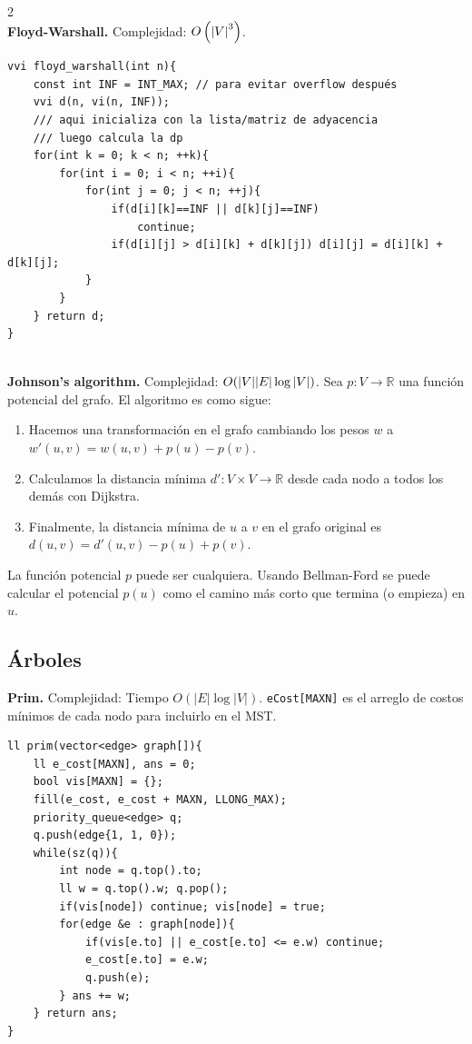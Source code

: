 \documentclass[10pt,spanish,mexico]{article}
\numberwithin{equation}{section}
\newcommand{\R}{\mathbb{R}}
\newcommand{\pa}[1]{\left( #1 \right)}
\begin{document}
\begin{multicols}{2}
\vspace{-1.2\baselineskip}
\hrulefill\\
\textbf{Floyd-Warshall.} Complejidad: $O\pa{\abs{V}^3}$.
\begin{verbatim}
vvi floyd_warshall(int n){
    const int INF = INT_MAX; // para evitar overflow después
    vvi d(n, vi(n, INF));
    /// aqui inicializa con la lista/matriz de adyacencia
    /// luego calcula la dp
    for(int k = 0; k < n; ++k){
        for(int i = 0; i < n; ++i){
            for(int j = 0; j < n; ++j){
                if(d[i][k]==INF || d[k][j]==INF)
                    continue;
                if(d[i][j] > d[i][k] + d[k][j]) d[i][j] = d[i][k] + d[k][j];
            }
        }
    } return d;
}
\end{verbatim}

\vspace{-1.2\baselineskip}
\hrulefill\\
\textbf{Johnson's algorithm.} Complejidad: $O(\abs{V}\abs{E}\log\abs{V})$. Sea $p: V \to \R$ una función potencial del grafo. El algoritmo es como sigue:
\begin{enumerate}[1.]
    \item Hacemos una transformación en el grafo cambiando los pesos $w$ a $w'(u, v) = w(u, v) + p(u) - p(v)$.
    \item Calculamos la distancia mínima $d': V \times V \to \R$ desde cada nodo a todos los demás con Dijkstra.
    \item Finalmente, la distancia mínima de $u$ a $v$ en el grafo original es $d(u, v) = d'(u, v) - p(u) + p(v)$.
\end{enumerate}
La función potencial $p$ puede ser cualquiera. Usando Bellman-Ford se puede calcular el potencial $p(u)$ como el camino más corto que termina (o empieza) en $u$.

\hrulefill
\subsection{Árboles}
\textbf{Prim.} Complejidad: Tiempo $O(|E| \log |V|)$. \texttt{eCost[MAXN]} es el arreglo de costos mínimos de cada nodo para incluirlo en el MST.
\begin{verbatim}
ll prim(vector<edge> graph[]){
    ll e_cost[MAXN], ans = 0;
    bool vis[MAXN] = {};
    fill(e_cost, e_cost + MAXN, LLONG_MAX);
    priority_queue<edge> q;
    q.push(edge{1, 1, 0});
    while(sz(q)){
        int node = q.top().to;
        ll w = q.top().w; q.pop();
        if(vis[node]) continue; vis[node] = true;
        for(edge &e : graph[node]){
            if(vis[e.to] || e_cost[e.to] <= e.w) continue;
            e_cost[e.to] = e.w;
            q.push(e);
        } ans += w;
    } return ans;
}
\end{verbatim}


\end{multicols}
\end{document}
